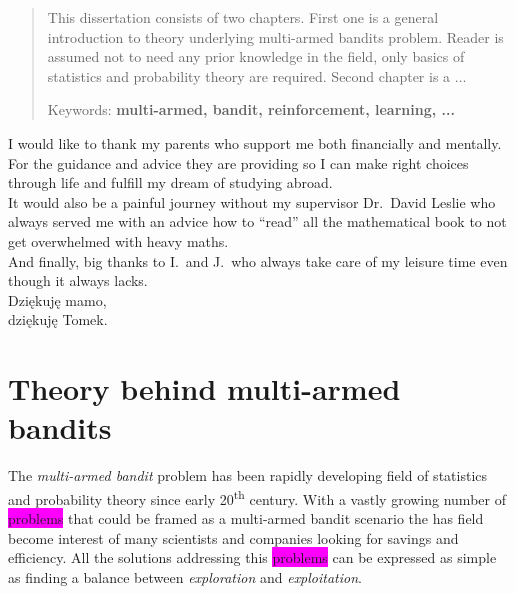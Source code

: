 \documentclass[12pt, a4paper, pdflatex]{report}
\newcommand{\ts}{\textsuperscript}
\newenvironment{dedication}
  {\clearpage           %
   \thispagestyle{empty}%
   \vspace*{\stretch{1}}%
   \itshape             %
   \raggedleft          %
  }
  {\par %
   \vspace{\stretch{3}} %
   \clearpage           %
  }
\begin{document}
\begin{abstract}
This dissertation consists of two chapters. First one is a general introduction to theory underlying multi-armed bandits problem. Reader is assumed not to need any prior knowledge in the field, only basics of statistics and probability theory are required. Second chapter is a ...
\begin{center}
Keywords: \textbf{multi-armed, bandit, reinforcement, learning, ...}
\end{center}
\end{abstract}

\begin{dedication}
I would like to thank my parents who support me both financially and mentally. For the guidance and advice they are providing so I can make right choices through life and fulfill my dream of studying abroad.\\
It would also be a painful journey without my supervisor Dr.\ David Leslie who always served me with an advice how to ``read'' all the mathematical book to not get overwhelmed with heavy maths.\\
And finally, big thanks to I.\ and J.\ who always take care of my leisure time even though it always lacks.\\[2cm]
Dzi\k{e}kuj\k{e} mamo,\\
dzi\k{e}kuj\k{e} Tomek.
\end{dedication}

\newpage
\tableofcontents
\newpage

\chapter{Theory behind multi-armed bandits}
The \emph{multi-armed bandit} problem has been rapidly developing field of statistics and probability theory since early 20\ts{th} century. With a vastly growing number of \colorbox{magenta}{problems} that could be framed as a multi-armed bandit scenario the has field become interest of many scientists and companies looking for savings and efficiency. All the solutions addressing this \colorbox{magenta}{problems} can be expressed as simple as finding a balance between \emph{exploration} and \emph{exploitation}.
\end{document}
